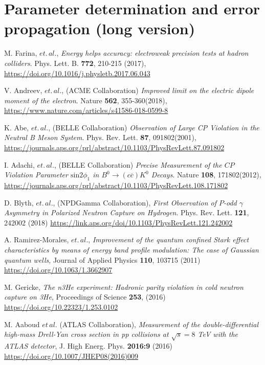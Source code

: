 \documentclass{article}
\begin{document}
\section*{Parameter determination and error propagation (long version)}


%


\begin{thebibliography}{9}

M. Farina,  $et.\,al.$,
\textit{Energy helps accuracy: electroweak precision tests at hadron colliders}.
Phys. Lett. B. \textbf{772}, 210-215 (2017),
\url{https://doi.org/10.1016/j.physletb.2017.06.043}

V. Andreev, $et.\,al.$, (ACME Collaboration)
\textit{Improved limit on the electric dipole moment of the electron}.
Nature \textbf{562}, 355-360(2018),
\url{https://www.nature.com/articles/s41586-018-0599-8}

K. Abe, $et.\,al.$, (BELLE Collaboration)
\textit{Observation of Large CP Violation in the Neutral B Meson System}.
Phys. Rev. Lett. \textbf{87}, 091802(2001),
\url{https://journals.aps.org/prl/abstract/10.1103/PhysRevLett.87.091802}

I. Adachi, $et.\,al.$, (BELLE Collaboration)
\textit{Precise Measurement of the $CP$ Violation Parameter $\mathrm{sin}﻿2{\ensuremath{\phi}}_{1}$ in ${B}^{0}\ensuremath{\rightarrow}(c\overline{c}){K}^{0}$ Decays}.
Nature \textbf{108}, 171802(2012),
\url{https://journals.aps.org/prl/abstract/10.1103/PhysRevLett.108.171802}

D. Blyth, $et.\,al.$, (NPDGamma Collaboration),
\textit{First Observation of $P$-odd $\ensuremath{\gamma}$ Asymmetry in Polarized Neutron Capture on Hydrogen}.
Phys. Rev. Lett. \textbf{121},  242002 (2018)
\url{https://link.aps.org/doi/10.1103/PhysRevLett.121.242002} 
 
A. Ramirez-Morales, $et.\,al.$,
\textit{Improvement of the quantum confined Stark effect characteristics by means of energy band profile modulation: The case of Gaussian quantum wells},
Journal of Applied Physics  \textbf{110}, 103715 (2011)
\url{https://doi.org/10.1063/1.3662907}

M. Gericke,
\textit{The n3He experiment: Hadronic parity violation in cold neutron capture on 3He},
Proceedings of Science \textbf{253}, (2016)
\url{https://doi.org/10.22323/1.253.0102}

M. Aaboud $et\,al.$ (ATLAS Collaboration),
\textit{Measurement of the double-differential high-mass Drell-Yan cross section in pp collisions at $\sqrt{s}=8$ TeV with the ATLAS detector},
J. High Energ. Phys.  \textbf{2016:9} (2016)
\url{https://doi.org/10.1007/JHEP08(2016)009}


\end{thebibliography}
\end{document}
